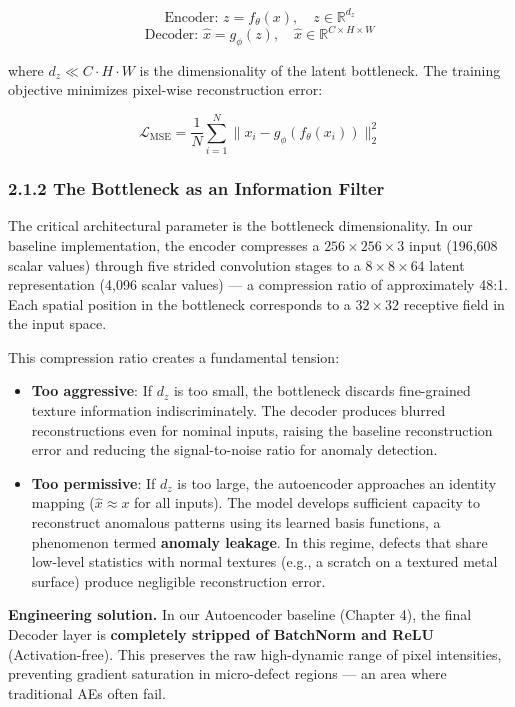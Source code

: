 \[\text{Encoder: } z = f_\theta(x), \quad z \in \mathbb{R}^{d_z}\] \[\text{Decoder: } \hat{x} = g_\phi(z), \quad \hat{x} \in \mathbb{R}^{C \times H \times W}\]

where \(d_z \ll C \cdot H \cdot W\) is the dimensionality of the latent bottleneck. The training objective minimizes pixel-wise reconstruction error:

\[\mathcal{L}_{\text{MSE}} = \frac{1}{N} \sum_{i=1}^{N} \| x_i - g_\phi(f_\theta(x_i)) \|_2^2\]

\subsubsection{2.1.2 The Bottleneck as an Information Filter}\label{the-bottleneck-as-an-information-filter}

The critical architectural parameter is the bottleneck dimensionality. In our baseline implementation, the encoder compresses a \(256 \times 256 \times 3\) input (196,608 scalar values) through five strided convolution stages to a \(8 \times 8 \times 64\) latent representation (4,096 scalar values) --- a compression ratio of approximately 48:1. Each spatial position in the bottleneck corresponds to a \(32 \times 32\) receptive field in the input space.

This compression ratio creates a fundamental tension:

\begin{itemize}
\item
  \textbf{Too aggressive}: If \(d_z\) is too small, the bottleneck discards fine-grained texture information indiscriminately. The decoder produces blurred reconstructions even for nominal inputs, raising the baseline reconstruction error and reducing the signal-to-noise ratio for anomaly detection.
\item
  \textbf{Too permissive}: If \(d_z\) is too large, the autoencoder approaches an identity mapping (\(\hat{x} \approx x\) for all inputs). The model develops sufficient capacity to reconstruct anomalous patterns using its learned basis functions, a phenomenon termed \textbf{anomaly leakage}. In this regime, defects that share low-level statistics with normal textures (e.g., a scratch on a textured metal surface) produce negligible reconstruction error.
\end{itemize}

\textbf{Engineering solution.} In our Autoencoder baseline (Chapter 4), the final Decoder layer is \textbf{completely stripped of BatchNorm and ReLU} (Activation-free). This preserves the raw high-dynamic range of pixel intensities, preventing gradient saturation in micro-defect regions --- an area where traditional AEs often fail.

